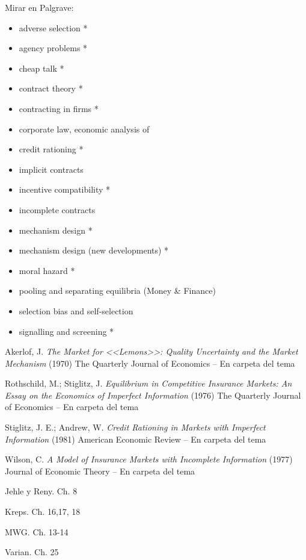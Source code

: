 \documentclass{nuevotema}
\begin{document}
Mirar en Palgrave:
\begin{itemize}
	\item adverse selection *
	\item agency problems *
	\item cheap talk * 
	\item contract theory *
	\item contracting in firms *
	\item corporate law, economic analysis of
	\item credit rationing *
	\item implicit contracts
	\item incentive compatibility *
	\item incomplete contracts
	\item mechanism design *
	\item mechanism design (new developments) *
	\item moral hazard *
	\item pooling and separating equilibria (Money \& Finance)
	\item selection bias and self-selection
	\item signalling and screening *
\end{itemize}

Akerlof, J. \textit{The Market for <<Lemons>>: Quality Uncertainty and the Market Mechanism} (1970) The Quarterly Journal of Economics -- En carpeta del tema

Rothschild, M.; Stiglitz, J. \textit{Equilibrium in Competitive Insurance Markets: An Essay on the Economics of Imperfect Information} (1976) The Quarterly Journal of Economics -- En carpeta del tema

Stiglitz, J. E.; Andrew, W. \textit{Credit Rationing in Markets with Imperfect Information} (1981) American Economic Review -- En carpeta del tema

Wilson, C. \textit{A Model of Insurance Markets with Incomplete Information} (1977) Journal of Economic Theory -- En carpeta del tema

Jehle y Reny. Ch. 8

Kreps. Ch. 16,17, 18

MWG. Ch. 13-14 

Varian. Ch. 25
\end{document}
